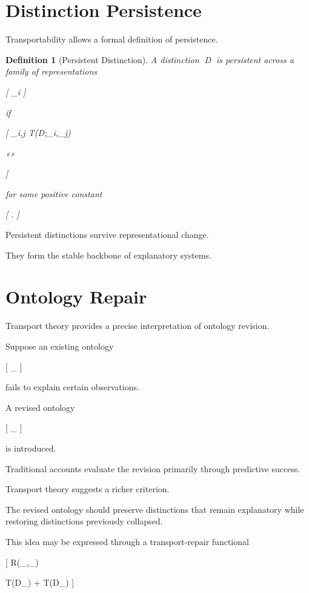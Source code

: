 \documentclass[11pt,oneside,openany]{book}
\newtheorem{definition}{Definition}[chapter] \newtheorem{theorem}{Theorem}[chapter] \newtheorem{proposition}{Proposition}[chapter] \newtheorem{lemma}{Lemma}[chapter] \newtheorem{corollary}{Corollary}[chapter] \newtheorem{remark}{Remark}[chapter]
\begin{document}
\section{Distinction Persistence}

Transportability allows a formal definition of persistence.

\begin{definition}[Persistent Distinction]

A distinction D is persistent across a family of representations

[
{\pi_i}
]

if

[
\inf_{i,j}
T(D;\pi_i,\pi_j)

«»

\epsilon
]

for some positive constant

[
\epsilon.
]

\end{definition}

Persistent distinctions survive representational change.

They form the stable backbone of explanatory systems.

\section{Ontology Repair}

Transport theory provides a precise interpretation of ontology revision.

Suppose an existing ontology

[
\pi_{}
]

fails to explain certain observations.

A revised ontology

[
\pi_{}
]

is introduced.

Traditional accounts evaluate the revision primarily through predictive success.

Transport theory suggests a richer criterion.

The revised ontology should preserve distinctions that remain explanatory while restoring distinctions previously collapsed.

This idea may be expressed through a transport-repair functional

[
R(\pi_{},\pi_{})

\alpha
T(D_{})
+
\beta
T(D_{})
]
\end{document}
